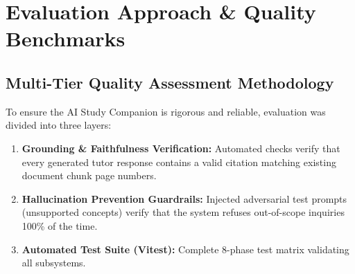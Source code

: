 \documentclass[11pt,a4paper]{article}
\begin{document}
\section{Evaluation Approach \& Quality Benchmarks}

\subsection{Multi-Tier Quality Assessment Methodology}
To ensure the AI Study Companion is rigorous and reliable, evaluation was divided into three layers:
\begin{enumerate}[noitemsep]
    \item \textbf{Grounding \& Faithfulness Verification:} Automated checks verify that every generated tutor response contains a valid citation matching existing document chunk page numbers.
    \item \textbf{Hallucination Prevention Guardrails:} Injected adversarial test prompts (unsupported concepts) verify that the system refuses out-of-scope inquiries 100\% of the time.
    \item \textbf{Automated Test Suite (Vitest):} Complete 8-phase test matrix validating all subsystems.
\end{enumerate}
\end{document}

